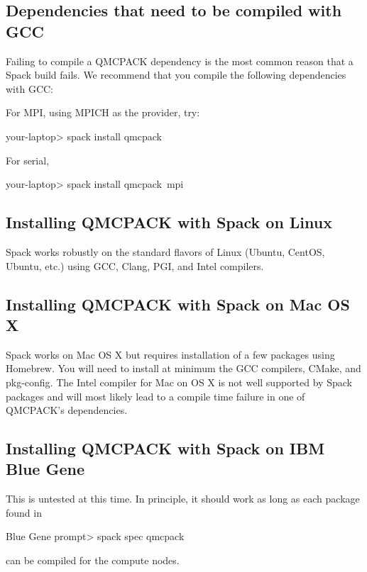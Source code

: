 \subsection{Dependencies that need to be compiled with GCC}
Failing to compile a QMCPACK dependency is the most common reason that
a Spack build fails. We recommend that you compile the following
dependencies with GCC:

For MPI, using MPICH as the provider, try:
\begin{shade}

your-laptop> spack install qmcpack%
\end{shade}

For serial,
\begin{shade}

your-laptop> spack install qmcpack~mpi%

\end{shade}

\subsection{Installing QMCPACK with Spack on Linux}
Spack works robustly on the standard flavors of Linux (Ubuntu, CentOS,
Ubuntu, etc.) using GCC, Clang, PGI, and Intel compilers.

\subsection{Installing QMCPACK with Spack on Mac OS X}
Spack works on Mac OS X but requires installation of a few packages
using Homebrew. You will need to install at minimum the GCC compilers,
CMake, and pkg-config. The Intel compiler for Mac on OS X is not well
supported by Spack packages and will most likely lead to a compile
time failure in one of QMCPACK's dependencies.

\subsection{Installing QMCPACK with Spack on IBM Blue Gene}
This is untested at this time. In principle, it should work as long as each
package found in

\begin{shade}
Blue Gene prompt> spack spec qmcpack
\end{shade}
can be compiled for the compute nodes.

